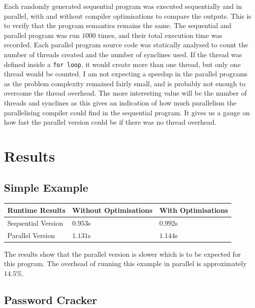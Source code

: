 Each randomly generated sequential program was executed sequentially and in parallel, with and without compiler optimisations to compare the outputs. This is to verify that the program semantics remains the same. The sequential and parallel program was run $1000$ times, and their total execution time was recorded. Each parallel program source code was statically analysed to count the number of threads created and the number of synclines used. If the thread was defined inside a \texttt{for loop}, it would create more than one thread, but only one thread would be counted. I am not expecting a speedup in the parallel programs as the problem complexity remained fairly small, and is probably not enough to overcome the thread overhead. The more interesting value will be the number of threads and synclines as this gives an indication of how much parallelism the parallelising compiler could find in the sequential program. It gives us a gauge on how fast the parallel version could be if there was no thread overhead.

\section{Results}
\subsection{Simple Example}

\begin{tabularx}{\textwidth}{ | >{\centering\arraybackslash}X | >{\centering\arraybackslash}X | >{\centering\arraybackslash}X |}
	\hline
    Runtime Results & Without Optimisations & With Optimisations \\
    \hline
    Sequential Version & $0.953$s & $0.992$s \\
    \hline
    Parallel Version   & $1.131$s & $1.144$s \\
    \hline
\end{tabularx}

The results show that the parallel version is slower which is to be expected for this program. The overhead of running this example in parallel is approximately $14.5\%$.

\subsection{Password Cracker}
\label{sec:evaluation-results-password-cracker}

